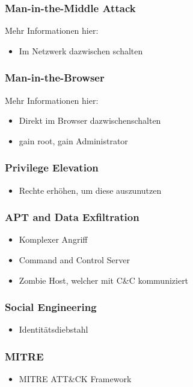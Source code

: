 \subsubsection{Man-in-the-Middle Attack}
Mehr Informationen hier: 
\begin{itemize}
    \item Im Netzwerk dazwischen schalten
\end{itemize}


\subsubsection{Man-in-the-Browser}
Mehr Informationen hier: 
\begin{itemize}
    \item Direkt im Browser dazwischenschalten
    \item gain root, gain Administrator
\end{itemize}


\subsubsection{Privilege Elevation}
\begin{itemize}
    \item Rechte erhöhen, um diese auszunutzen
\end{itemize}


\subsubsection{APT and Data Exfiltration}
\begin{itemize}
    \item Komplexer Angriff
    \item Command and Control Server
    \item Zombie Host, welcher mit C\&C kommuniziert
\end{itemize}

\subsubsection{Social Engineering}
\begin{itemize}
    \item Identitätsdiebstahl
\end{itemize}

\subsubsection{MITRE}
\begin{itemize}
    \item MITRE ATT\&CK Framework
\end{itemize}

\vfill
$ $
